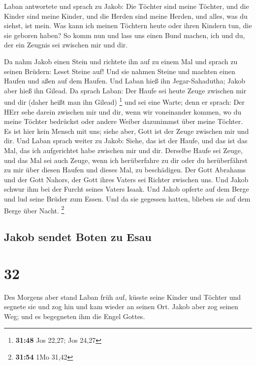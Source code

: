  Laban antwortete und sprach zu Jakob: Die Töchter sind
meine Töchter, und die Kinder sind meine Kinder, und die Herden sind
meine Herden, und alles, was du siehst, ist mein. Was kann ich meinen
Töchtern heute oder ihren Kindern tun, die sie geboren haben?
 So komm nun und lass uns einen Bund machen, ich und du,
der ein Zeugnis sei zwischen mir und dir.

 Da nahm Jakob einen Stein und richtete ihn auf zu einem
Mal  und sprach zu seinen Brüdern: Leset Steine auf! Und
sie nahmen Steine und machten einen Haufen und aßen auf dem Haufen.
 Und Laban hieß ihn Jegar-Sahadutha; Jakob aber hieß ihn
Gilead.  Da sprach Laban: Der Haufe sei heute Zeuge
zwischen mir und dir (daher heißt man ihn Gilead) \footnote{\textbf{31:48}
  Jos 22,27; Jos 24,27}  und sei eine Warte; denn er
sprach: Der HErr sehe darein zwischen mir und dir, wenn wir voneinander
kommen,  wo du meine Töchter bedrückst oder andere Weiber
dazunimmst über meine Töchter. Es ist hier kein Mensch mit uns; siehe
aber, Gott ist der Zeuge zwischen mir und dir.  Und Laban
sprach weiter zu Jakob: Siehe, das ist der Haufe, und das ist das Mal,
das ich aufgerichtet habe zwischen mir und dir.  Derselbe
Haufe sei Zeuge, und das Mal sei auch Zeuge, wenn ich herüberfahre zu
dir oder du herüberfährst zu mir über diesen Haufen und dieses Mal, zu
beschädigen.  Der Gott Abrahams und der Gott Nahors, der
Gott ihres Vaters sei Richter zwischen uns.  Und Jakob
schwur ihm bei der Furcht seines Vaters Isaak. Und Jakob opferte auf dem
Berge und lud seine Brüder zum Essen. Und da sie gegessen hatten,
blieben sie auf dem Berge über Nacht. \footnote{\textbf{31:54} 1Mo 31,42}

\hypertarget{jakob-sendet-boten-zu-esau}{%
\subsection{Jakob sendet Boten zu
Esau}\label{jakob-sendet-boten-zu-esau}}

\hypertarget{section-31}{%
\section{32}\label{section-31}}

 Des Morgens aber stand Laban früh auf, küsste seine
Kinder und Töchter und segnete sie und zog hin und kam wieder an seinen
Ort.  Jakob aber zog seinen Weg; und es begegneten ihm die
Engel Gottes.

